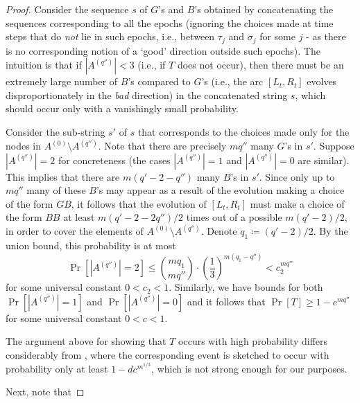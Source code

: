 \documentclass{article}
\begin{document}
\begin{proof}
Consider the sequence $s$ of $G$'s and $B$'s obtained by concatenating the sequences corresponding to all the epochs (ignoring the choices made at time steps that do \emph{not} lie in such epochs, i.e., between $\tau_j$ and $\sigma_j$ for some $j$ - as there is no corresponding notion of a `good' direction outside such epochs). The intuition is that if $|A^{(q'')}| < 3$ (i.e., if $T$ does not occur), then there must be an extremely large number of $B$'s compared to $G$'s (i.e., the arc $[L_t,R_t]$ evolves disproportionately in the \emph{bad} direction) in the concatenated string $s$, which should occur only with a vanishingly small probability.

Consider the sub-string $s'$ of $s$ that corresponds to the choices made only for the nodes in $A^{(0)}\setminus A^{(q'')}$. Note that there are precisely $mq''$ many $G$'s in $s'$. Suppose $|A^{(q'')}| = 2$ for concreteness (the cases $|A^{(q'')}| = 1$ and $|A^{(q'')}| = 0$ are similar). This implies that there are $m(q' - 2 - q'')$ many $B$'s in $s'$. Since only up to $mq''$ many of these $B$'s may appear as a result of the evolution making a choice of the form $GB$, it follows that the evolution of $[L_t,R_t]$ must make a choice of the form $BB$ at least $m(q' - 2 - 2q'')/2$ times out of a possible $m(q' - 2)/2$, in order to cover the elements of $A^{(0)}\setminus A^{(q'')}$. Denote $q_1 \coloneqq (q' - 2)/2$. By the union bound, this probability is at most 
\[
\Pr[|A^{(q'')}| = 2] \leq \binom{mq_1}{mq''}\cdot \left(\frac{1}{3}\right)^{m(q_1 - q'')} < c_2^{mq''}
\]
for some universal constant $0<c_2<1$. Similarly, we have bounds for both $\Pr[|A^{(q'')}| = 1]$ and $\Pr[|A^{(q'')}| = 0]$ and it follows that $\Pr[T] \geq 1 - c^{mq''}$ for some universal constant $0<c<1$. 

\begin{remark}
The argument above for showing that $T$ occurs with high probability differs considerably from \cite{DvirMPY12}, where the corresponding event is sketched to occur with probability only at least $1-dc^{m^{1/3}}$, which is not strong enough for our purposes.  
\end{remark}

Next, note that


\end{proof}
\end{document}
